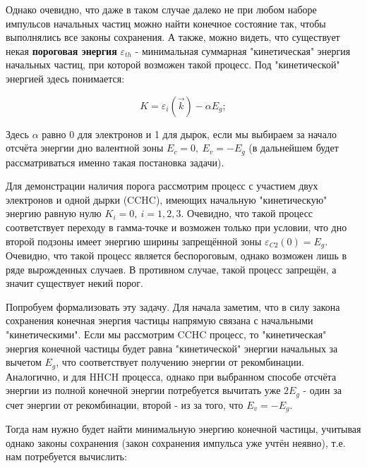 \documentclass[../main.tex]{subfiles}
\begin{document}
    Однако очевидно, что даже в таком случае далеко не при любом наборе импульсов
    начальных частиц можно найти конечное состояние так, чтобы выполнялись все 
    законы сохранения. А также, можно видеть, что существует некая 
    \textbf{пороговая энергия} $\varepsilon_{th}$ - минимальная суммарная 
    "кинетическая" энергия начальных частиц, при которой возможен такой процесс.
    Под "кинетической" энергией здесь понимается:

    \begin{equation*}
        K = \varepsilon_i(\vec{k}) - \alpha E_g;
    \end{equation*}

    Здесь $\alpha$ равно 0 для электронов и 1 для дырок, если мы выбираем за 
    начало отсчёта энергии дно валентной зоны $E_c = 0,~E_v = -E_g$
    (в дальнейшем будет рассматриваться именно такая постановка задачи).

    Для демонстрации наличия порога рассмотрим процесс с участием двух 
    электронов и одной дырки (CCHC), имеющих начальную "кинетическую" энергию 
    равную нулю $K_i = 0,~i=1,2,3$. Очевидно, что такой процесс соответствует
    переходу в гамма-точке и возможен только при условии, что дно второй подзоны
    имеет энергию ширины запрещённой зоны $\varepsilon_{C2}(0) = E_g$. Очевидно,
    что такой процесс является беспороговым, однако возможен лишь в ряде
    вырожденных случаев. В противном случае, такой процесс запрещён, а значит 
    существует некий порог.

    Попробуем формализовать эту задачу. Для начала заметим, что в силу закона
    сохранения конечная энергия частицы напрямую связана с начальными "кинетическими".
    Если мы рассмотрим CCHC процесс, то "кинетическая" энергия конечной частицы
    будет равна "кинетической" энергии начальных за вычетом $E_g$, что соответствует
    получению энергии от рекомбинации. Аналогично, и для HHCH процесса, однако
    при выбранном способе отсчёта энергии из полной конечной энергии потребуется 
    вычитать уже $2E_g$ - один за счет энергии от рекомбинации, второй - из за того, 
    что $E_v = - E_g$.

    Тогда нам нужно будет найти минимальную энергию конечной частицы, учитывая
    однако законы сохранения (закон сохранения импульса уже учтён неявно), 
    т.е. нам потребуется вычислить: 
\end{document}
